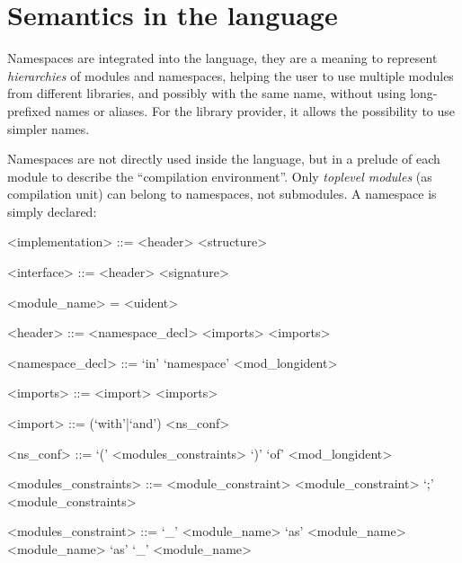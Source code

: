 \section{Semantics in the language}

Namespaces are integrated into the language, they are a meaning to represent
\emph{hierarchies} of modules and namespaces, helping the user to use multiple
modules from different libraries, and possibly with the same name, without using
long-prefixed names or aliases. For the library provider, it allows the
possibility to use simpler names.

Namespaces are not directly used inside the language, but in a prelude of each
module to describe the ``compilation environment''. Only \emph{toplevel modules}
(as compilation unit) can belong to namespaces, not submodules. A namespace is
simply declared: 




\begin{grammar}
<implementation> ::= <header> <structure>

<interface> ::= <header> <signature>

<module_name> = <uident>

<header> ::= <namespace_decl> <imports>
\alt <imports>

<namespace_decl> ::= `in' `namespace' <mod_longident>

<imports> ::= <import> <imports> 

<import> ::= (`with'|`and') <ns_conf> 

<ns_conf> ::= `(' <modules_constraints> `)' `of' <mod_longident>

<modules_constraints> ::= <module_constraint>
\alt <module_constraint> `;' <module_constraints>

<modules_constraint> ::= `_'
\alt <module_name> `as' <module_name>
\alt <module_name> `as' `_'
\alt <module_name>
\end{grammar}

